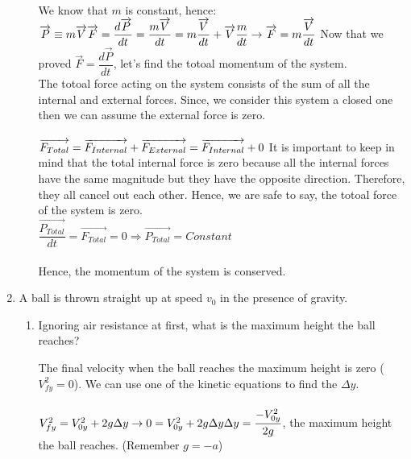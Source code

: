 \documentclass[fleqn]{article}
\begin{document}
\begin{enumerate}
\begin{enumerate}
        \textcolor{hwColor}{
          We know that $m$ is constant, hence: \\
          $
            \overrightarrow{P}\equiv m\overrightarrow{V} \\ \\
            \overrightarrow{F}=\dfrac{d\overrightarrow{P}}{dt}=\dfrac{m\overrightarrow{V}}{dt}=m\dfrac{\overrightarrow{V}}{dt}+\overrightarrow{V}\dfrac{m}{dt} \rightarrow \overrightarrow{F}=m\dfrac{\overrightarrow{V}}{dt} \\ \\
          $
          Now that we proved $\overrightarrow{F}=\dfrac{d\overrightarrow{P}}{dt}$, let's find the totoal momentum of the system. \\
          The totoal force acting on the system consists of the sum of all the internal and external forces. Since, we consider this system
          a closed one then we can assume the external force is zero. \\
          \\
          $
            \overrightarrow{F_{Total}}=\overrightarrow{F_{Internal}}+\overrightarrow{F_{External}}=\overrightarrow{F_{Internal}}+0 \\ \\
          $
          It is important to keep in mind that the total internal force is zero because all the internal forces have the same magnitude but they have the opposite direction. 
          Therefore, they all cancel out each other. Hence, we are safe to say, the totoal force of the system is zero. \\
          $
            \dfrac{\overrightarrow{P_{Total}}}{dt}=\overrightarrow{F_{Total}}=0 \Rightarrow \overrightarrow{P_{Total}}=Constant 
          $ \\
          \\
          Hence, the momentum of the system is conserved.
        }

    \end{enumerate}

    \item A ball is thrown straight up at speed $v_0$ in the presence of gravity.
    \begin{enumerate}
      \item Ignoring air resistance at first, what is the maximum height the ball reaches?

        \textcolor{hwColor}{
          The final velocity when the ball reaches the maximum height is zero ($V^2_{fy}=0$). We can use one of the kinetic equations
          to find the $\Delta y$. \\
          \\
          $
            V^2_{fy}=V^2_{0y}+2g\Delta y \rightarrow 0=V^2_{0y}+2g\Delta y \\ \\
            \Delta y=\dfrac{-V^2_{0y}}{2g}
          $, the maximum height the ball reaches. (Remember $g=-a$)
        }


\end{enumerate}
\end{enumerate}
\end{document}
